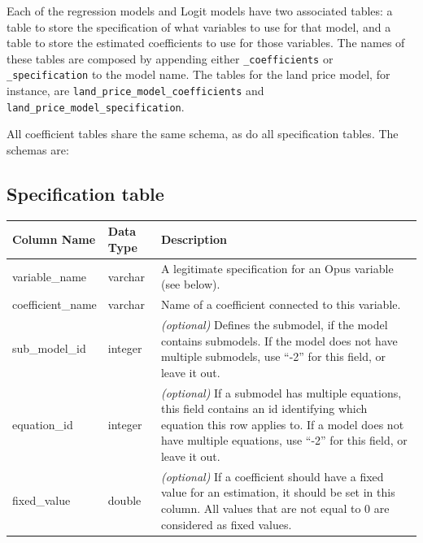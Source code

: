 Each of the regression models and Logit models have two associated
tables: a table to store the specification of what variables to use
for that model, and a table to store the estimated coefficients to
use for those variables.  The names of these tables are composed by
appending either \verb|_coefficients| or \verb|_specification| to
the model name.  The tables for the land price model, for instance,
are \verb|land_price_model_coefficients| and
\verb|land_price_model_specification|.

All coefficient tables share the same schema, as do all
specification tables. The schemas are:


\subsection{Specification table}

\begin{tabular}{|l|l|p{4.5in}|}

\hline
\textbf{Column Name} & \textbf{Data Type} & \textbf{Description} \\\hline 
variable_name & varchar & A legitimate specification for an Opus variable (see below).\\\hline 
coefficient_name & varchar & Name of a coefficient connected to this variable.\\\hline
sub_model_id & integer & \emph{(optional)} Defines the submodel, if the model
contains submodels. If the model does not have multiple submodels, use ``-2'' for this field, or leave it out.\\\hline
equation_id & integer & \emph{(optional)} If a submodel has multiple equations, this field
contains an id identifying which equation this row applies to.  If a model does
not have multiple equations, use ``-2'' for this field, or leave it out. \\\hline
fixed_value & double & \emph{(optional)} If a coefficient should have a fixed value for an estimation,
it should be set in this column. All values that are not equal to 0 are considered as fixed values.\\
\hline
\end{tabular}

